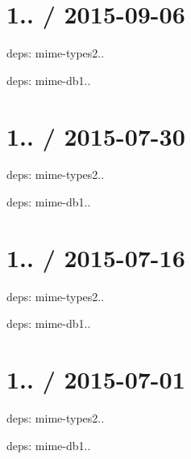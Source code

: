 \section*{1.. / 2015-\/09-\/06 }


\begin{DoxyItemize}
\item deps\+: mime-\/types2..
\begin{DoxyItemize}
\item deps\+: mime-\/db1..
\end{DoxyItemize}
\end{DoxyItemize}

\section*{1.. / 2015-\/07-\/30 }


\begin{DoxyItemize}
\item deps\+: mime-\/types2..
\begin{DoxyItemize}
\item deps\+: mime-\/db1..
\end{DoxyItemize}
\end{DoxyItemize}

\section*{1.. / 2015-\/07-\/16 }


\begin{DoxyItemize}
\item deps\+: mime-\/types2..
\begin{DoxyItemize}
\item deps\+: mime-\/db1..
\end{DoxyItemize}
\end{DoxyItemize}

\section*{1.. / 2015-\/07-\/01 }


\begin{DoxyItemize}
\item deps\+: mime-\/types2..
\begin{DoxyItemize}
\item deps\+: mime-\/db1..
\end{DoxyItemize}
\end{DoxyItemize}

